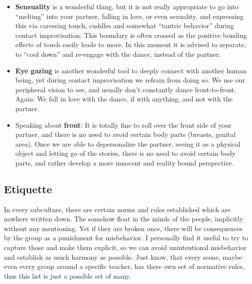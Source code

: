 \begin{itemize}
    \item \textbf{Sensuality} is a wonderful thing, but it is not really appropriate to go into ``melting'' into your partner, falling in love, or even sexuality, and expressing this via caressing touch, cuddles and somewhat ``tantric behavior'' during contact improvisation.
    This boundary is often crossed as the positive bonding effects of touch easily leads to more.
    In this moment it is advised to separate, to ``cool down'' and re-engage with the dance, instead of the partner.
    \item \textbf{Eye gazing} is another wonderful tool to deeply connect with another human being, yet during contact improvisation we refrain from doing so.
    We use our peripheral vision to see, and usually don't constantly dance front-to-front.
    Again: We fall in love with the dance, if with anything, and not with the partner.
    \item Speaking about \textbf{front}: It is totally fine to roll over the front side of your partner, and there is no need to avoid certain body parts (breasts, genital area).
    Once we are able to depersonalize the partner, seeing it as a physical object and letting go of the stories, there is no need to avoid certain body parts, and rather develop a more innocent and reality bound perspective.
\end{itemize}

\subsection{Etiquette}\label{subsec:etiquette}

In every subculture, there are certain norms and rules established which are nowhere written down.
The somehow float in the minds of the people, implicitly without any mentioning.
Yet if they are broken once, there will be consequences by the group as a punishment for misbehavior.
I personally find it useful to try to capture those and make them explicit, so we can avoid unintentional misbehavior and establish as much harmony as possible.
Just know, that every scene, maybe even every group around a specific teacher, has there own set of normative rules, thus this list is just a possible set of many.

